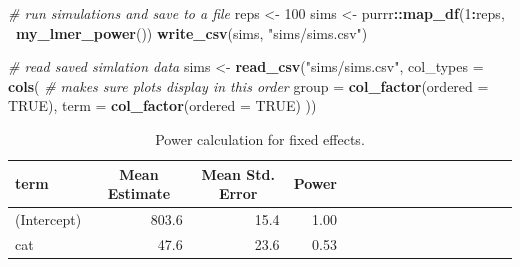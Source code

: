\documentclass[doc,floatsintext]{apa6}
\newenvironment{Shaded}{\begin{snugshade}}{\end{snugshade}}
\newcommand{\KeywordTok}[1]{\textcolor[rgb]{0.13,0.29,0.53}{\textbf{#1}}}
\newcommand{\DataTypeTok}[1]{\textcolor[rgb]{0.13,0.29,0.53}{#1}}
\newcommand{\DecValTok}[1]{\textcolor[rgb]{0.00,0.00,0.81}{#1}}
\newcommand{\FloatTok}[1]{\textcolor[rgb]{0.00,0.00,0.81}{#1}}
\newcommand{\StringTok}[1]{\textcolor[rgb]{0.31,0.60,0.02}{#1}}
\newcommand{\CommentTok}[1]{\textcolor[rgb]{0.56,0.35,0.01}{\textit{#1}}}
\newcommand{\OtherTok}[1]{\textcolor[rgb]{0.56,0.35,0.01}{#1}}
\newcommand{\OperatorTok}[1]{\textcolor[rgb]{0.81,0.36,0.00}{\textbf{#1}}}
\newcommand{\NormalTok}[1]{#1}
\begin{document}
\begin{Shaded}
\begin{Highlighting}[]
\CommentTok{# run simulations and save to a file}
\NormalTok{reps <-}\StringTok{ }\DecValTok{100}
\NormalTok{sims <-}\StringTok{ }\NormalTok{purrr}\OperatorTok{::}\KeywordTok{map_df}\NormalTok{(}\DecValTok{1}\OperatorTok{:}\NormalTok{reps, }\OperatorTok{~}\KeywordTok{my_lmer_power}\NormalTok{())}
\KeywordTok{write_csv}\NormalTok{(sims, }\StringTok{"sims/sims.csv"}\NormalTok{)}
\end{Highlighting}
\end{Shaded}

\begin{Shaded}
\begin{Highlighting}[]
\CommentTok{# read saved simlation data}
\NormalTok{sims <-}\StringTok{ }\KeywordTok{read_csv}\NormalTok{(}\StringTok{"sims/sims.csv"}\NormalTok{, }\DataTypeTok{col_types =} \KeywordTok{cols}\NormalTok{(}
  \CommentTok{# makes sure plots display in this order}
  \DataTypeTok{group =} \KeywordTok{col_factor}\NormalTok{(}\DataTypeTok{ordered =} \OtherTok{TRUE}\NormalTok{),}
  \DataTypeTok{term =} \KeywordTok{col_factor}\NormalTok{(}\DataTypeTok{ordered =} \OtherTok{TRUE}\NormalTok{)}
\NormalTok{))}
\end{Highlighting}
\end{Shaded}

\begin{Shaded}
\end{Shaded}

\begin{table}[H]
\begin{center}
\begin{threeparttable}
\caption{\label{tab:calc-power-table}Power calculation for fixed effects.}
\begin{tabular}{lrrrlrrrlrrrlrrr}
\toprule
term & \multicolumn{1}{c}{Mean Estimate} & \multicolumn{1}{c}{Mean Std. Error} & \multicolumn{1}{c}{Power}\\
\midrule
(Intercept) & 803.6 & 15.4 & 1.00\\
cat & 47.6 & 23.6 & 0.53\\
\bottomrule
\end{tabular}
\end{threeparttable}
\end{center}
\end{table}
\end{document}
